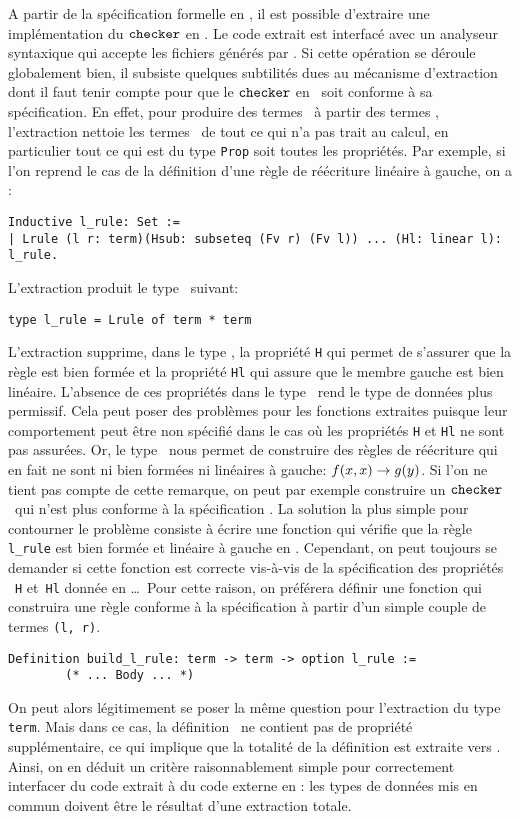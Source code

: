 A partir de la spécification formelle en \coq, il est possible d'extraire une implémentation
du $\mathtt{checker}$ en \ocaml. 
Le code extrait est interfacé avec un analyseur syntaxique qui accepte les fichiers générés
par \timbuk. Si cette opération se déroule globalement bien, il subsiste quelques subtilités
dues au mécanisme d'extraction dont il faut tenir compte pour que le $\mathtt{checker}$ en \ocaml\ soit conforme 
à sa spécification. En effet, pour produire des termes \ocaml\ à partir des termes \coq, l'extraction
nettoie les termes \coq\ de tout ce qui n'a pas trait au calcul, en particulier tout ce qui est du type
\lstinline!Prop! soit toutes les propriétés. Par exemple, si l'on reprend le cas de la définition 
d'une règle de réécriture linéaire à gauche, on a :
\begin{lstlisting}
Inductive l_rule: Set :=
| Lrule (l r: term)(Hsub: subseteq (Fv r) (Fv l)) ... (Hl: linear l): l_rule.
\end{lstlisting}
L'extraction produit le type \ocaml\ suivant:
\switchlstcaml
\begin{lstlisting}
type l_rule = Lrule of term * term
\end{lstlisting}
L'extraction supprime, dans le type \ocaml, la propriété \lstinline!H! qui permet de s'assurer que la règle est bien
formée et la propriété \lstinline!Hl! qui assure que le membre gauche est bien linéaire. L'absence de ces propriétés dans le type 
\ocaml\ rend le type de données plus permissif. Cela peut poser des problèmes pour les fonctions extraites puisque
leur comportement peut être non spécifié dans le cas où les propriétés \lstinline!H! et \lstinline!Hl! ne sont pas
assurées. Or, le type \ocaml\ nous permet de construire des règles de réécriture qui en fait ne sont ni bien formées ni
linéaires à gauche: $f(x,x) \rightarrow g(y)$. Si l'on ne tient pas compte de cette remarque, on peut par exemple construire un $\mathtt{checker}$
\ocaml\ qui n'est plus conforme à la spécification \coq. La solution la plus simple pour contourner le problème consiste 
à écrire une fonction qui vérifie que la règle \lstinline!l_rule! est bien formée et linéaire à gauche en \ocaml.
Cependant, on peut toujours se demander si cette fonction est correcte vis-à-vis de la spécification des propriétés
~\lstinline!H! et~\lstinline!Hl! donnée en \coq\dots\ Pour cette raison, on préférera définir une fonction qui 
construira une règle conforme à la spécification à partir d'un simple couple de termes \lstinline!(l, r)!.
\switchlstcoq
\begin{lstlisting}
Definition build_l_rule: term -> term -> option l_rule :=
        (* ... Body ... *)
\end{lstlisting}
On peut alors légitimement se poser la même question pour l'extraction du type \lstinline!term!. 
Mais dans ce cas, la définition \coq\ ne contient pas de propriété supplémentaire, ce qui implique
que la totalité de la définition est extraite vers \ocaml.
Ainsi, on en déduit un critère raisonnablement simple pour correctement interfacer du code extrait à du code externe en \ocaml:
les types de données mis en commun doivent être le résultat d'une extraction totale.


